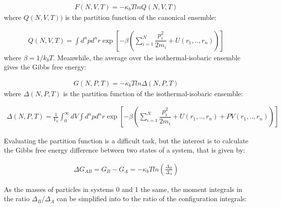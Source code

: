 \begin{equation}
\label{eq:fcano}
\begin{aligned}
F(N,V,T) = -\kappa_{b}T ln Q(N,V,T)
\end{aligned}
\end{equation}
where $Q(N,V,T))$ is the partition function of the canonical ensemble:

\begin{equation}
\label{eq:partican}
\begin{aligned}
Q(N,V,T) = \int d^{n}p d^{n}r \exp \left[ -\beta \left( \sum_{i=1}^{N}\dfrac{p_{i}^{2}}{2m_{i}} + U(r_{1},..,r_{n}) \right)
\right]
\end{aligned}
\end{equation}
where $\beta=1/k_{b}T$. Meanwhile, the average over the isothermal-isobaric ensemble gives the Gibbs free energy:

\begin{equation}
\label{eq:fisobari}
\begin{aligned}
G(N,P,T) = -\kappa_{b}T ln \Delta (N,P,T)
\end{aligned}
\end{equation}
where $\Delta (N,P,T)$ is the partition function of the isothermal-isobaric ensemble:

\begin{equation}
\label{eq:partiso}
\begin{aligned}
\Delta (N,P,T) = \frac{1}{V_{0}} \int_{0}^{\infty} dV \int d^{n}p d^{n}r \exp \left[ -\beta \left( \sum_{i=1}^{N}\dfrac{p_{i}^{2}}{2m_{i}} + U(r_{1},..,r_{n}) + PV(r_{1},..,r_{n}) \right) \right]
\end{aligned}
\end{equation}

Evaluating the partition function is a difficult task, but the interest is to calculate the Gibbs free energy difference between two states of a system, that is given by: 

\begin{equation}
\label{eq:dif}
\begin{aligned}
\Delta G_{AB} = G_{B} - G_{A}= -\kappa_{b}T ln \left( \frac{\Delta_{B}}{\Delta_{A}}\right) 
\end{aligned}
\end{equation}

As the masses of particles in systems 0 and 1 the same, the moment integrals in the ratio ${\Delta_{B}}/{\Delta_{A}}$ can be simplified into to the ratio of the configuration integrals:

